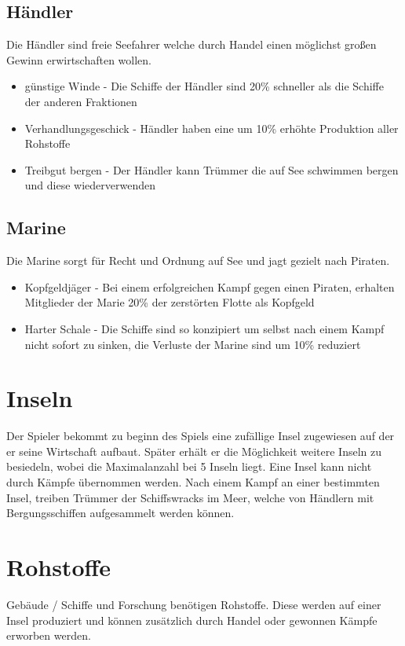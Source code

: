 \documentclass[10pt,a4paper]{article}
\begin{document}
\subsection{Händler}
Die Händler sind freie Seefahrer welche durch Handel einen möglichst großen Gewinn erwirtschaften wollen. 
\begin{itemize}
\item günstige Winde - Die Schiffe der Händler sind 20\% schneller als die Schiffe der anderen Fraktionen
\item Verhandlungsgeschick - Händler haben eine um 10\% erhöhte Produktion aller Rohstoffe
\item Treibgut bergen - Der Händler kann Trümmer die auf See schwimmen bergen und diese wiederverwenden
\end{itemize}

\subsection{Marine}
Die Marine sorgt für Recht und Ordnung auf See und jagt gezielt nach Piraten. 
\begin{itemize}
\item Kopfgeldjäger - Bei einem erfolgreichen Kampf gegen einen Piraten, erhalten Mitglieder der Marie 20\% der zerstörten Flotte als Kopfgeld
\item Harter Schale - Die Schiffe sind so konzipiert um selbst nach einem Kampf nicht sofort zu sinken, die Verluste der Marine sind um 10\% reduziert
\end{itemize}

\section{Inseln}
Der Spieler bekommt zu beginn des Spiels eine zufällige Insel zugewiesen auf der er seine Wirtschaft aufbaut. Später erhält er die Möglichkeit weitere Inseln zu besiedeln, wobei die Maximalanzahl bei 5 Inseln liegt.
Eine Insel kann nicht durch Kämpfe übernommen werden. Nach einem Kampf an einer bestimmten Insel, treiben Trümmer der Schiffswracks im Meer, welche von Händlern mit Bergungsschiffen aufgesammelt werden können.

\section{Rohstoffe}
Gebäude / Schiffe und Forschung benötigen Rohstoffe. Diese werden auf einer Insel produziert und können zusätzlich durch Handel oder gewonnen Kämpfe erworben werden.
\end{document}
